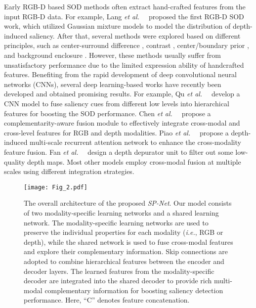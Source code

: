 \documentclass[10pt,twocolumn,letterpaper]{article}
\def\ie{\emph{i.e.}}
\def\etal{{\em et al.~}}
\def\ours{\emph{SP-Net}}
\begin{document}
Early RGB-D based SOD methods often extract hand-crafted features from the input RGB-D data. For example, Lang \etal~\cite{lang2012depth} proposed the first RGB-D SOD work, which utilized Gaussian mixture models to model the distribution of depth-induced saliency. After that, several methods were explored based on different principles, such as center-surround difference \cite{ju2014depth,guo2016salient}, contrast \cite{desingh2013depth,peng2014rgbd,ren2015exploiting}, center/boundary prior \cite{zhu2017innovative,liang2018stereoscopic}, and background enclosure \cite{feng2016local}. However, these methods usually suffer from unsatisfactory performance due to the limited expression ability of handcrafted features. Benefiting from the rapid development of deep convolutional neural networks (CNNs), several deep learning-based works \cite{qu2017rgbd,zhao2019contrast,piao2019depth,zhang2020uc,fan2019rethinking} have recently been developed and obtained promising results. For example, Qu \etal~\cite{qu2017rgbd} develop a CNN model to fuse saliency cues from different low levels into hierarchical features for boosting the SOD performance. Chen \etal~\cite{chen2018progressively} propose a complementarity-aware fusion module to effectively integrate cross-modal and cross-level features for RGB and depth modalities. Piao \etal~\cite{piao2019depth} propose a depth-induced multi-scale recurrent attention network to enhance the cross-modality feature fusion. Fan \etal~\cite{fan2019rethinking} design a depth depurator unit to filter out some low-quality depth maps. Most other models \cite{chen2018attention,liu2019two,chen2019three,han2017cnns,li2020,lieccv20} employ cross-modal fusion at multiple scales using different integration strategies.


\begin{figure*}
	\begin{centering}
		\texttt{[image: Fig\_2.pdf]}
		\caption{The overall architecture of the proposed \ours. Our model consists of two modality-specific learning networks and a shared learning network. The modality-specific learning networks are used to preserve the individual properties for each modality (\ie, RGB or depth), while the shared network is used to fuse cross-modal features and explore their complementary information. Skip connections are adopted to combine hierarchical features between the encoder and decoder layers. The learned features from the modality-specific decoder are integrated into the shared decoder to provide rich multi-modal complementary information for boosting saliency detection performance. Here, “C” denotes feature concatenation.
		}\vspace{-0.25cm}
		\label{fig02}
	\end{centering}
\end{figure*}
\end{document}
